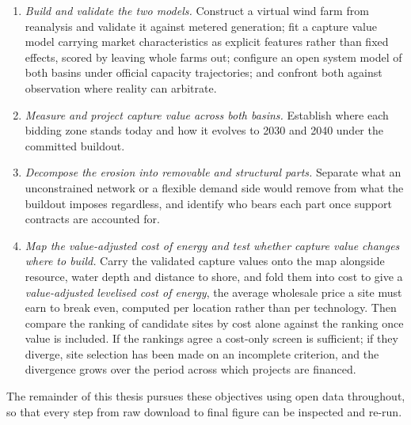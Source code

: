 \begin{enumerate}
    \item \textit{Build and validate the two models.} Construct a virtual wind
    farm from reanalysis and validate it against metered generation; fit a
    capture value model carrying market characteristics as explicit features
    rather than fixed effects, scored by leaving whole farms out; configure an
    open system model of both basins under official capacity trajectories; and
    confront both against observation where reality can arbitrate.

    \item \textit{Measure and project capture value across both basins.}
    Establish where each bidding zone stands today and how it evolves to 2030
    and 2040 under the committed buildout.

    \item \textit{Decompose the erosion into removable and structural parts.}
    Separate what an unconstrained network or a flexible demand side would
    remove from what the buildout imposes regardless, and identify who bears
    each part once support contracts are accounted for.

    \item \textit{Map the value-adjusted cost of energy and test whether capture value
    changes where to build.} Carry the validated capture values onto the map
    alongside resource, water depth and distance to shore, and fold them into
    cost to give a \textit{value-adjusted levelised cost of energy}, the average
    wholesale price a site must earn to break even, computed per location rather
    than per technology. Then compare the ranking of candidate sites by cost
    alone against the ranking once value is included. If the rankings agree a
    cost-only screen is sufficient; if they diverge, site selection has been
    made on an incomplete criterion, and the divergence grows over the period
    across which projects are financed.

    \end{enumerate}

The remainder of this thesis pursues these objectives using open data
throughout, so that every step from raw download to final figure can be
inspected and re-run.
